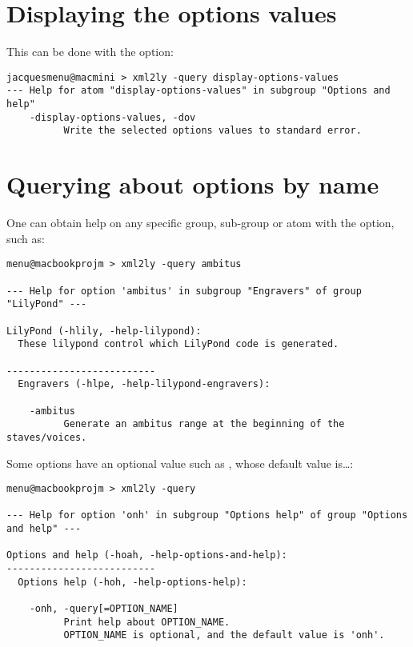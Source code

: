 \section{Displaying the options values}

This can be done with the  option:
\begin{lstlisting}[language=Terminal]
jacquesmenu@macmini > xml2ly -query display-options-values
--- Help for atom "display-options-values" in subgroup "Options and help"
    -display-options-values, -dov
          Write the selected options values to standard error.
\end{lstlisting}


\section{Querying about options by name}

One can obtain help on any specific group, sub-group or atom with the  option, such as:
\begin{lstlisting}[language=Terminal]
menu@macbookprojm > xml2ly -query ambitus

--- Help for option 'ambitus' in subgroup "Engravers" of group "LilyPond" ---

LilyPond (-hlily, -help-lilypond):
  These lilypond control which LilyPond code is generated.

--------------------------
  Engravers (-hlpe, -help-lilypond-engravers):

    -ambitus
          Generate an ambitus range at the beginning of the staves/voices.

\end{lstlisting}

Some options have an optional value such as , whose default value is\dots {}:
\begin{lstlisting}[language=Terminal]
menu@macbookprojm > xml2ly -query

--- Help for option 'onh' in subgroup "Options help" of group "Options and help" ---

Options and help (-hoah, -help-options-and-help):
--------------------------
  Options help (-hoh, -help-options-help):

    -onh, -query[=OPTION_NAME]
          Print help about OPTION_NAME.
          OPTION_NAME is optional, and the default value is 'onh'.
\end{lstlisting}


